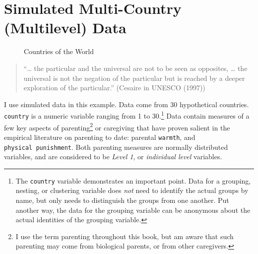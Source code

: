 \documentclass[
  letterpaper,
  DIV=11,
  numbers=noendperiod]{scrreprt}
\begin{document}

\chapter{Simulated Multi-Country (Multilevel)
Data}\label{sec-simulateddata}

\begin{figure}


\caption{\label{fig-world}Countries of the World}

\end{figure}%

\begin{quote}
``\ldots{} the particular and the universal are not to be seen as
opposites, \ldots{} the universal is not the negation of the particular
but is reached by a deeper exploration of the particular.'' (Cesaire in
UNESCO (1997)) 
\end{quote}

I use simulated data in this example. Data come from 30 hypothetical
countries. \texttt{country} is a numeric variable ranging from 1 to
30.\footnote{The \texttt{country} variable demonstrates an important
  point. Data for a grouping, nesting, or clustering variable does
  \emph{not} need to identify the actual groups by name, but only needs
  to distinguish the groups from one another. Put another way, the data
  for the grouping variable can be anonymous about the actual identities
  of the grouping variable.} Data contain measures of a few key aspects
of parenting\footnote{I use the term parenting throughout this book, but
  am aware that such parenting may come from biological parents, or from
  other caregivers.} or caregiving that have proven salient in the
empirical literature on parenting to date: parental \texttt{warmth}, and
\texttt{physical\ punishment}. Both parenting measures are normally
distributed variables, and are considered to be \emph{Level 1}, or
\emph{individual level} variables.
\end{document}
